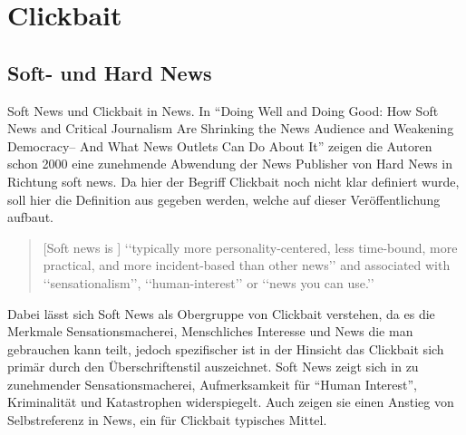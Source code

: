 \chapter{Clickbait} 
\label{cha:clickbait}

\section{Soft- und Hard News} %
\label{sec:soft_und_hard_news}
Soft News und Clickbait in News.
In \enquote{Doing Well and Doing Good: How Soft News and Critical Journalism Are Shrinking
the News Audience and Weakening Democracy–
And What News Outlets Can Do About It} zeigen die Autoren schon 2000 eine zunehmende Abwendung der News Publisher von Hard News in Richtung soft news.
Da hier der Begriff Clickbait noch nicht klar definiert wurde, soll hier die Definition aus \cite{blom2015click} gegeben werden, welche auf dieser Veröffentlichung aufbaut.
\begin{quote}
[Soft news is ] ‘‘typically more personality-centered, less time-bound, more practical, and
more incident-based than other news’’ and associated with ‘‘sensationalism’’, ‘‘human-interest’’ or ‘‘news you can use.’’
\end{quote}
Dabei lässt sich Soft News als Obergruppe von Clickbait verstehen, da es die Merkmale Sensationsmacherei, Menschliches Interesse und News die man gebrauchen kann teilt, jedoch spezifischer ist in der Hinsicht das Clickbait sich primär durch den Überschriftenstil auszeichnet.
Soft News zeigt sich in zu zunehmender Sensationsmacherei, Aufmerksamkeit für  \enquote{Human Interest}, Kriminalität und Katastrophen widerspiegelt. Auch zeigen sie einen Anstieg von Selbstreferenz in News, ein für Clickbait typisches Mittel. 

